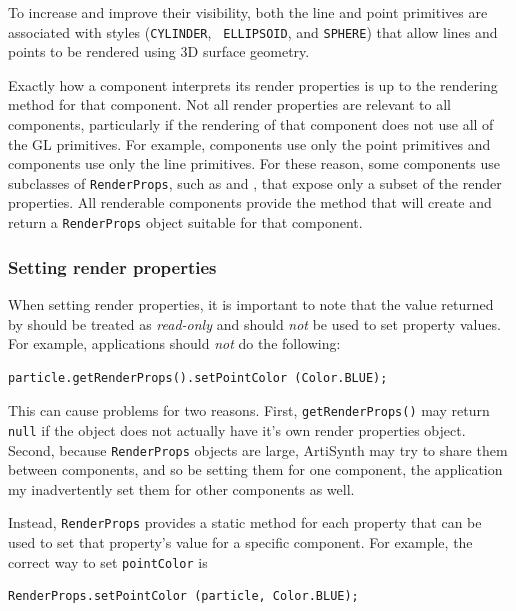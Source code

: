 To increase and improve their visibility, both the line and point
primitives are associated with styles ({\tt CYLINDER}, {\tt
ELLIPSOID}, and {\tt SPHERE}) that allow lines and points to be
rendered using 3D surface geometry.

Exactly how a component interprets its render properties is up to the
rendering method for that component.  Not all render properties are
relevant to all components, particularly if the rendering of that
component does not use all of the GL primitives. For example,
 components use only
the point primitives and
 components use only
the line primitives. For these reason, some components use subclasses
of {\tt RenderProps}, such as
 and
, that expose only a subset
of the render properties. All renderable components provide the method
 that
will create and return a {\tt RenderProps} object suitable for that
component.

\subsubsection{Setting render properties}

When setting render properties, it is important to note that
the value returned by
should be treated as {\it read-only} and should {\it not}
be used to set property values.
For example, applications should {\it not} do the
following:
\begin{lstlisting}[]
   particle.getRenderProps().setPointColor (Color.BLUE);
\end{lstlisting}
%
This can cause problems for two reasons. First, {\tt getRenderProps()}
may return {\tt null} if the object does not actually have it's own
render properties object. Second, because {\tt RenderProps} objects
are large, ArtiSynth may try to share them between components,
and so be setting them for one component, the application my
inadvertently set them for other components as well.

Instead, {\tt RenderProps} provides a static method for each property
that can be used to set that property's value for a specific
component.  For example, the correct way to set {\tt pointColor} is
%
\begin{lstlisting}[]
   RenderProps.setPointColor (particle, Color.BLUE);
\end{lstlisting}
%

